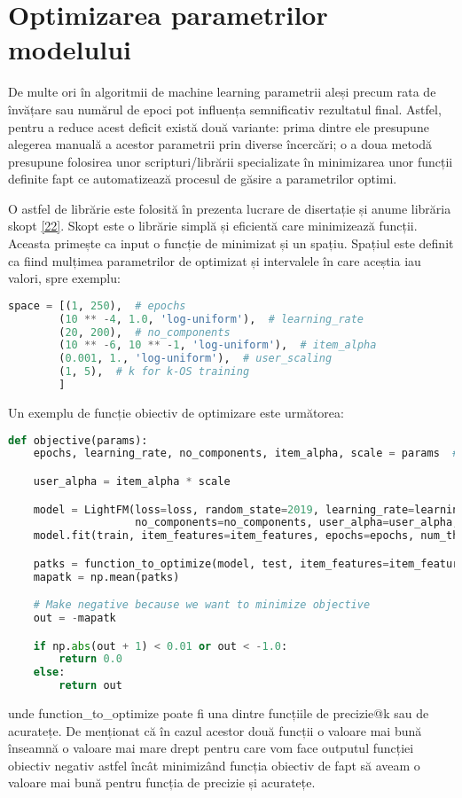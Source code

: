 \section{Optimizarea parametrilor modelului}
De multe ori în algoritmii de machine learning parametrii aleși precum rata de învățare sau numărul de epoci pot influența semnificativ rezultatul final. Astfel, pentru a reduce acest deficit există două variante: prima dintre ele presupune alegerea manuală a acestor parametrii prin diverse încercări; o a doua metodă presupune folosirea unor scripturi/librării specializate în minimizarea unor funcții definite fapt ce automatizează procesul de găsire a parametrilor optimi.

O astfel de librărie este folosită în prezenta lucrare de disertație și anume librăria skopt \hyperlink{skopt}{[22]}. Skopt este o librărie simplă și eficientă care minimizează funcții. Aceasta primește ca input o funcție de minimizat și un spațiu. Spațiul este definit ca fiind mulțimea parametrilor de optimizat și intervalele în care aceștia iau valori, spre exemplu:
\begin{lstlisting}[language=Python, caption=Spațiul parametrilor de optimizat]
space = [(1, 250),  # epochs
        (10 ** -4, 1.0, 'log-uniform'),  # learning_rate
        (20, 200),  # no_components
        (10 ** -6, 10 ** -1, 'log-uniform'),  # item_alpha
        (0.001, 1., 'log-uniform'),  # user_scaling
        (1, 5),  # k for k-OS training
        ] 
\end{lstlisting}

Un exemplu de funcție obiectiv de optimizare este următorea:
\begin{lstlisting}[language=Python, caption=Funcția obiectiv]
def objective(params):
    epochs, learning_rate, no_components, item_alpha, scale = params  # 'k_os'

    user_alpha = item_alpha * scale

    model = LightFM(loss=loss, random_state=2019, learning_rate=learning_rate,
                    no_components=no_components, user_alpha=user_alpha, item_alpha=item_alpha)
    model.fit(train, item_features=item_features, epochs=epochs, num_threads=threads, verbose=True)

    patks = function_to_optimize(model, test, item_features=item_features, num_threads=threads)
    mapatk = np.mean(patks)

    # Make negative because we want to minimize objective
    out = -mapatk

    if np.abs(out + 1) < 0.01 or out < -1.0:
        return 0.0
    else:
        return out
\end{lstlisting}
unde function\_to\_optimize poate fi una dintre funcțiile de precizie@k sau de acuratețe. De menționat că în cazul acestor două funcții o valoare mai bună înseamnă o valoare mai mare drept pentru care vom face outputul funcției obiectiv negativ astfel încât minimizând funcția obiectiv de fapt să aveam o valoare mai bună pentru funcția de precizie și acuratețe.

